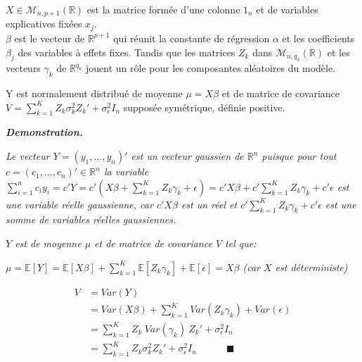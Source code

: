 \documentclass[11pt,fleqn]{book} %
\begin{document}
	\vspace{1em}
	
	$X \in \mathcal{M}_{n,p+1}(\mathbb{R})$ est la matrice formée d'une colonne $1_n$ et de variables explicatives fixées $x_j$.\\ 
	$\beta$ est le vecteur de $\mathbb{R}^{p+1}$ qui réunit la constante de régression $\alpha$ et les coefficients $\beta_j$  des variables à effets fixes. Tandis que les matrices $Z_k$ dans $\mathcal{M}_{n,q_k}(\mathbb{R})$ et les vecteurs $\gamma_k$ de $\mathbb{R}^{q_k}$ jouent un rôle pour les composantes aléatoires du modèle.
	
	\vspace{1em}
	
	\begin{proposition}
		
		Y est normalement distribué de moyenne  $\mu=X\beta$ et de matrice de covariance $V=\sum_{k=1}^{K} Z_k \sigma_k^2 Z_k'+\sigma^2_{\epsilon} I_{n}$  supposée symétrique, définie positive. 
		
		
	\end{proposition}
	
	\vspace{1em}
	
	\textit{\textbf{Demonstration.}}
	
	\vspace{0.5em}
	
	\textit{Le vecteur $Y=(y_1,...,y_n)'$ est un vecteur gaussien de $\mathbb{R}^{n}$ puisque pour tout $c=(c_1, ... ,c_{n})'\in \mathbb{R}^{n}$ la variable $\sum_{i=1}^{n}c_i y_i=c'Y=c'(X\beta+\sum_{k=1}^{K} Z_k \gamma_k+\epsilon)=c'X\beta+c'\sum_{k=1}^{K} Z_k \gamma_k+c'\epsilon$ est une variable réelle gaussienne, car $c'X\beta$ est un réel et $c'\sum_{k=1}^{K} Z_k \gamma_k+c'\epsilon$ est une somme de variables réelles gaussiennes.}
	
	\vspace{1em}
	
	\textit{$Y$ est de moyenne $\mu$ et de matrice de covariance $V$ tel que:}
	
	\vspace{1em}
	
	\textit{$\mu=\mathbb{E}[Y] = \mathbb{E}[X\beta]+\sum_{k=1}^{K}\mathbb{E}[Z_k \gamma_k]+\mathbb{E}[\epsilon]  = X\beta$ \quad  (car $X$ est déterministe)}
	
	\vspace{1em}
	
	\begin{align*}
		V&=Var(Y) \\
		&= Var(X\beta)+ \sum_{k=1}^{K} Var(Z_k \gamma_k)+Var(\epsilon) \\
		&= \sum_{k=1}^{K} Z_k\:Var(\gamma_k)\:Z_k'+\sigma^2_{\epsilon} I_{n}\\
		&=\sum_{k=1}^{K} Z_k \sigma_k^2 Z_k'+\sigma^2_{\epsilon} I_{n} \quad\quad\quad \blacksquare
	\end{align*}
	
\end{document}

